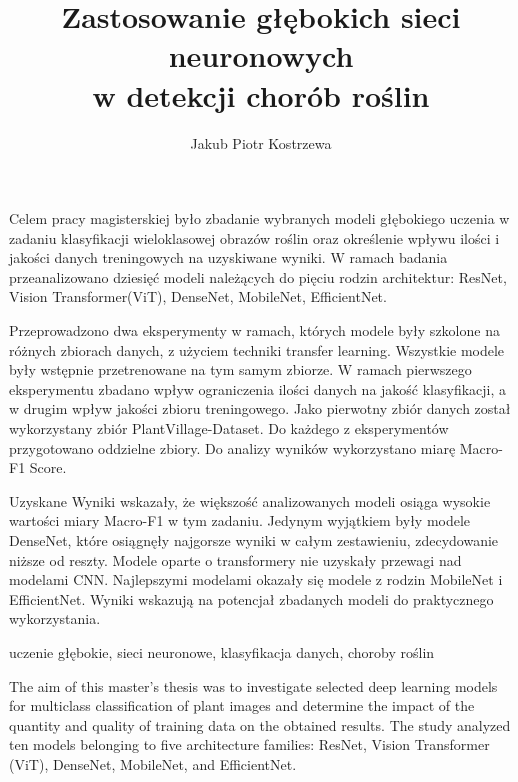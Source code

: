 \documentclass[
    left=2.5cm,         %
    right=2.5cm,        %
    top=2.5cm,          %
    bottom=3cm,         %
    bindingoffset=6mm,  %
    nohyphenation=false %
]{eiti/eiti-thesis}
\begin{document}
\MasterThesis %
{}
\title{
	Zastosowanie głębokich sieci neuronowych\\ w detekcji chorób roślin
}
\author{Jakub Piotr Kostrzewa}
\album{}
\date{\the\year}
\maketitle

\cleardoublepage %
\streszczenie Celem pracy magisterskiej było zbadanie wybranych modeli głębokiego uczenia w zadaniu klasyfikacji wieloklasowej obrazów roślin oraz określenie wpływu ilości i jakości danych treningowych na uzyskiwane wyniki. W ramach badania przeanalizowano dziesięć modeli należących do pięciu rodzin architektur: ResNet, Vision Transformer(ViT), DenseNet, MobileNet, EfficientNet.

 Przeprowadzono dwa eksperymenty w ramach, których modele były szkolone na różnych zbiorach danych, z użyciem techniki transfer learning. Wszystkie modele były wstępnie przetrenowane na tym samym zbiorze. W ramach pierwszego eksperymentu zbadano wpływ ograniczenia ilości danych na jakość klasyfikacji, a w drugim wpływ jakości zbioru treningowego. Jako pierwotny zbiór danych został wykorzystany zbiór PlantVillage-Dataset. Do każdego z eksperymentów przygotowano oddzielne zbiory. Do analizy wyników wykorzystano miarę Macro-F1 Score.
 
 Uzyskane Wyniki wskazały, że większość analizowanych modeli osiąga wysokie wartości miary Macro-F1 w tym zadaniu. Jedynym wyjątkiem były modele DenseNet, które osiągnęły najgorsze wyniki w całym zestawieniu, zdecydowanie niższe od reszty.  Modele oparte o transformery nie uzyskały przewagi nad modelami CNN. Najlepszymi modelami okazały się modele z rodzin MobileNet i EfficientNet. Wyniki wskazują na potencjał zbadanych modeli do praktycznego wykorzystania.

\slowakluczowe uczenie głębokie, sieci neuronowe, klasyfikacja danych, choroby roślin

\newpage
\abstract The aim of this master's thesis was to investigate selected deep learning models for multiclass classification of plant images and determine the impact of the quantity and quality of training data on the obtained results. The study analyzed ten models belonging to five architecture families: ResNet, Vision Transformer (ViT), DenseNet, MobileNet, and EfficientNet.
\end{document}
